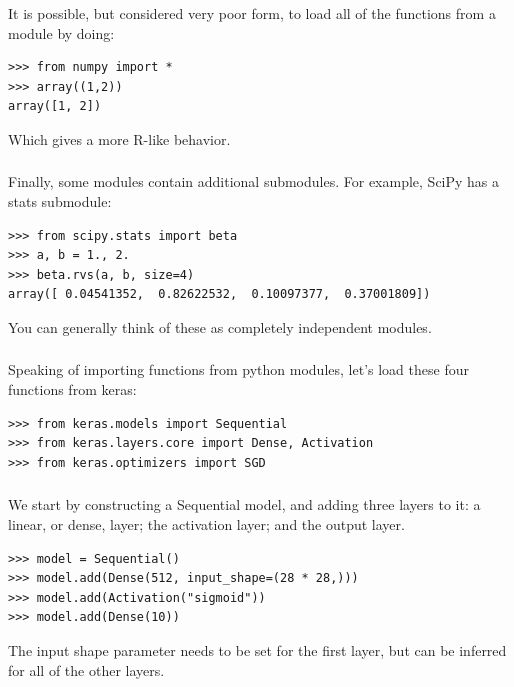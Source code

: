 \documentclass[xetex,mathserif,serif,aspectratio=169]{beamer}
\begin{document}
\begin{frame}[fragile] \frametitle{} \oldB \small

It is possible, but considered very poor form, to
load all of the functions from a module by doing:
\begin{verbatim}
>>> from numpy import *
>>> array((1,2))
array([1, 2])
\end{verbatim}
Which gives a more R-like behavior.

\end{frame}

\begin{frame}[fragile] \frametitle{} \oldB \small

Finally, some modules contain additional submodules.
For example, SciPy has a stats submodule:
\begin{verbatim}
>>> from scipy.stats import beta
>>> a, b = 1., 2.
>>> beta.rvs(a, b, size=4)
array([ 0.04541352,  0.82622532,  0.10097377,  0.37001809])
\end{verbatim}
You can generally think of these as completely
independent modules.

\end{frame}

\begin{frame}[fragile] \frametitle{} \oldB \small

\textbf{}

Speaking of importing functions from python modules,
let's load these four functions from keras:
\begin{verbatim}
>>> from keras.models import Sequential
>>> from keras.layers.core import Dense, Activation
>>> from keras.optimizers import SGD
\end{verbatim}

\end{frame}

\begin{frame}[fragile] \frametitle{} \oldB \small

\textbf{}

We start by constructing a Sequential model, and
adding three layers to it: a linear, or dense, layer;
the activation layer; and the output layer.
\begin{verbatim}
>>> model = Sequential()
>>> model.add(Dense(512, input_shape=(28 * 28,)))
>>> model.add(Activation("sigmoid"))
>>> model.add(Dense(10))
\end{verbatim}
The input shape parameter needs to be set for the
first layer, but can be inferred for all of the other
layers.

\end{frame}
\end{document}
